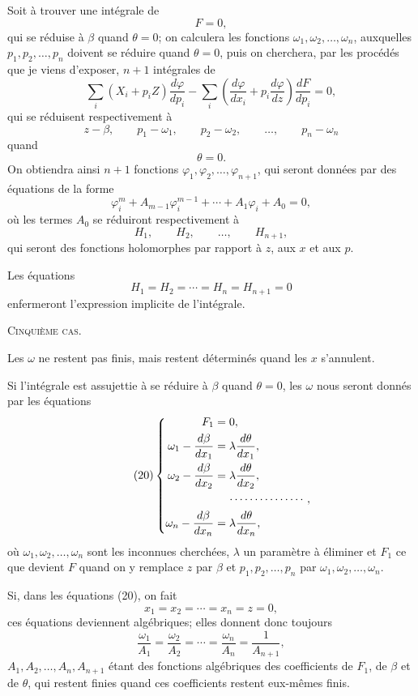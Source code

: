 \documentclass[11pt]{article}
\begin{document}
Soit à trouver une intégrale de
\[
F=0,
\]
qui se réduise à $\beta$ quand $\theta=0$; on calculera les fonctions $\omega_1,\omega_2,\ldots,\omega_n$, auxquelles $p_1,p_2,\ldots,p_n$ doivent se réduire quand $\theta=0$, puis on cherchera, par les procédés que je viens d’exposer, $n+1$ intégrales de
\[
\sum_i (X_i+p_iZ)\frac{d\varphi}{dp_i}
-\sum_i\left(\frac{d\varphi}{dx_i}+p_i\frac{d\varphi}{dz}\right)\frac{dF}{dp_i}=0,
\]
qui se réduisent respectivement à
\[
z-\beta,\qquad p_1-\omega_1,\qquad p_2-\omega_2,\qquad \ldots,\qquad p_n-\omega_n
\]
quand
\[
\theta=0.
\]
On obtiendra ainsi $n+1$ fonctions $\varphi_1,\varphi_2,\ldots,\varphi_{n+1}$, qui seront données par des équations de la forme
\[
\varphi_i^m+A_{m-1}\varphi_i^{m-1}+\cdots+A_1\varphi_i+A_0=0,
\]
où les termes $A_0$ se réduiront respectivement à
\[
H_1,\qquad H_2,\qquad \ldots,\qquad H_{n+1},
\]
qui seront des fonctions holomorphes par rapport à $z$, aux $x$ et aux $p$.

Les équations
\[
H_1=H_2=\cdots=H_n=H_{n+1}=0
\]
enfermeront l’expression implicite de l’intégrale.

\begin{center}
{\scshape Cinquième cas.}
\end{center}

Les $\omega$ ne restent pas finis, mais restent déterminés quand les $x$ s’annulent.

Si l’intégrale est assujettie à se réduire à $\beta$ quand $\theta=0$, les $\omega$ nous seront donnés par les équations
\begin{equation*}\tag{20}
\left\{
\begin{aligned}
F_1&=0,\\
\omega_1-\frac{d\beta}{dx_1}&=\lambda\frac{d\theta}{dx_1},\\
\omega_2-\frac{d\beta}{dx_2}&=\lambda\frac{d\theta}{dx_2},\\
&\hspace{1.2em}\cdots\cdots\cdots\cdots\cdots,\\
\omega_n-\frac{d\beta}{dx_n}&=\lambda\frac{d\theta}{dx_n},
\end{aligned}
\right.
\end{equation*}
où $\omega_1,\omega_2,\ldots,\omega_n$ sont les inconnues cherchées, $\lambda$ un paramètre à éliminer et $F_1$ ce que devient $F$ quand on y remplace $z$ par $\beta$ et $p_1,p_2,\ldots,p_n$ par $\omega_1,\omega_2,\ldots,\omega_n$.

Si, dans les équations (20), on fait
\[
x_1=x_2=\cdots=x_n=z=0,
\]
ces équations deviennent algébriques; elles donnent donc toujours
\[
\frac{\omega_1}{A_1}=\frac{\omega_2}{A_2}=\cdots=\frac{\omega_n}{A_n}=\frac{1}{A_{n+1}},
\]
$A_1,A_2,\ldots,A_n,A_{n+1}$ étant des fonctions algébriques des coefficients de $F_1$, de $\beta$ et de $\theta$, qui restent finies quand ces coefficients restent eux-mêmes finis.
\end{document}
